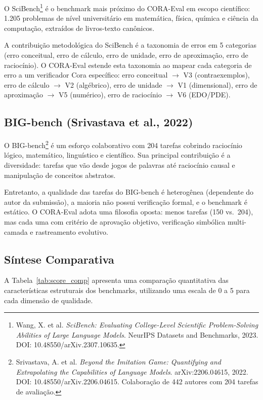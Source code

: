 O SciBench\footnote{Wang, X. et al. \textit{SciBench: Evaluating College-Level
Scientific Problem-Solving Abilities of Large Language Models}. NeurIPS
Datasets and Benchmarks, 2023. DOI: 10.48550/arXiv.2307.10635.} é o
benchmark mais próximo do CORA-Eval em escopo científico: 1.205 problemas
de nível universitário em matemática, física, química e ciência da
computação, extraídos de livros-texto canônicos.

A contribuição metodológica do SciBench é a taxonomia de erros em 5
categorias (erro conceitual, erro de cálculo, erro de unidade, erro de
 aproximação, erro de raciocínio). O CORA-Eval estende esta taxonomia ao
mapear cada categoria de erro a um verificador Cora específico: erro
conceitual $\rightarrow$ V3 (contraexemplos), erro de cálculo
$\rightarrow$ V2 (algébrico), erro de unidade $\rightarrow$ V1
(dimensional), erro de aproximação $\rightarrow$ V5 (numérico), erro de
raciocínio $\rightarrow$ V6 (EDO/PDE).

\subsection{BIG-bench (Srivastava et al., 2022)}

O BIG-bench\footnote{Srivastava, A. et al. \textit{Beyond the Imitation
Game: Quantifying and Extrapolating the Capabilities of Language Models}.
arXiv:2206.04615, 2022. DOI: 10.48550/arXiv.2206.04615. Colaboração de
442 autores com 204 tarefas de avaliação.} é um esforço colaborativo com
204 tarefas cobrindo raciocínio lógico, matemático, linguístico e
científico. Sua principal contribuição é a diversidade: tarefas que vão
desde jogos de palavras até raciocínio causal e manipulação de conceitos
abstratos.

Entretanto, a qualidade das tarefas do BIG-bench é heterogênea
(dependente do autor da submissão), a maioria não possui verificação
formal, e o benchmark é estático. O CORA-Eval adota uma filosofia oposta:
menos tarefas (150 vs.\ 204), mas cada uma com critério de aprovação
objetivo, verificação simbólica multi-camada e rastreamento evolutivo.

\subsection{Síntese Comparativa}

A Tabela~\ref{tab:score_comp} apresenta uma comparação quantitativa das
características estruturais dos benchmarks, utilizando uma escala de 0 a 5
para cada dimensão de qualidade.

